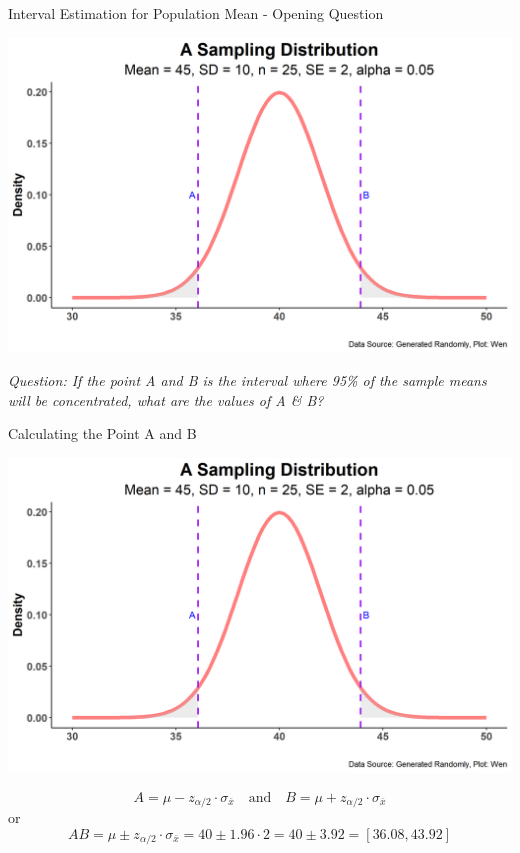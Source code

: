 \documentclass{beamer}
\begin{document}
\begin{frame}{Interval Estimation for Population Mean - Opening Question}


\begin{center}
\includegraphics[scale=0.5]{images/normalDistAreaSamplingDistMean45SE2.png}
\end{center}

\textit{Question: If the point A and B is the interval where 95\% of the sample means will be concentrated, what are the values of A \& B? }

\end{frame}

\begin{frame}{Calculating the Point A and B}

\begin{center}
\includegraphics[scale=0.4]{images/normalDistAreaSamplingDistMean45SE2.png}
\end{center}
$$ A = \mu - z_{\alpha/2} \cdot \sigma_{\bar{x}} \quad \text{and} \quad B = \mu + z_{\alpha/2} \cdot \sigma_{\bar{x}} $$
or
$$ AB = \mu \pm z_{\alpha/2} \cdot \sigma_{\bar{x}} = 40 \pm 1.96 \cdot 2 = 40 \pm 3.92 = [36.08, 43.92] $$

\end{frame}
\end{document}
